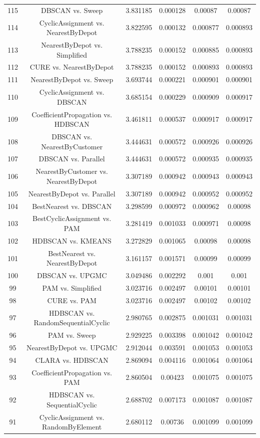\documentclass[a4paper,10pt]{article}
\begin{document}
\begin{landscape}
\begin{table}[!htp]
\begin{tabular}{cccccc}
115&DBSCAN vs. Sweep&3.831185&0.000128&0.00087&0.00087\\
114&CyclicAssignment vs. NearestByDepot&3.822595&0.000132&0.000877&0.000893\\
113&NearestByDepot vs. Simplified&3.788235&0.000152&0.000885&0.000893\\
112&CURE vs. NearestByDepot&3.788235&0.000152&0.000893&0.000893\\
111&NearestByDepot vs. Sweep&3.693744&0.000221&0.000901&0.000901\\
110&CyclicAssignment vs. DBSCAN&3.685154&0.000229&0.000909&0.000917\\
109&CoefficientPropagation vs. HDBSCAN&3.461811&0.000537&0.000917&0.000917\\
108&DBSCAN vs. NearestByCustomer&3.444631&0.000572&0.000926&0.000926\\
107&DBSCAN vs. Parallel&3.444631&0.000572&0.000935&0.000935\\
106&NearestByCustomer vs. NearestByDepot&3.307189&0.000942&0.000943&0.000943\\
105&NearestByDepot vs. Parallel&3.307189&0.000942&0.000952&0.000952\\
104&BestNearest vs. DBSCAN&3.298599&0.000972&0.000962&0.00098\\
103&BestCyclicAssignment vs. PAM&3.281419&0.001033&0.000971&0.00098\\
102&HDBSCAN vs. KMEANS&3.272829&0.001065&0.00098&0.00098\\
101&BestNearest vs. NearestByDepot&3.161157&0.001571&0.00099&0.00099\\
100&DBSCAN vs. UPGMC&3.049486&0.002292&0.001&0.001\\
99&PAM vs. Simplified&3.023716&0.002497&0.00101&0.00101\\
98&CURE vs. PAM&3.023716&0.002497&0.00102&0.00102\\
97&HDBSCAN vs. RandomSequentialCyclic&2.980765&0.002875&0.001031&0.001031\\
96&PAM vs. Sweep&2.929225&0.003398&0.001042&0.001042\\
95&NearestByDepot vs. UPGMC&2.912044&0.003591&0.001053&0.001053\\
94&CLARA vs. HDBSCAN&2.869094&0.004116&0.001064&0.001064\\
93&CoefficientPropagation vs. PAM&2.860504&0.00423&0.001075&0.001075\\
92&HDBSCAN vs. SequentialCyclic&2.688702&0.007173&0.001087&0.001087\\
91&CyclicAssignment vs. RandomByElement&2.680112&0.00736&0.001099&0.001099\\

\end{tabular}
\end{table}
\end{landscape}
\end{document}
